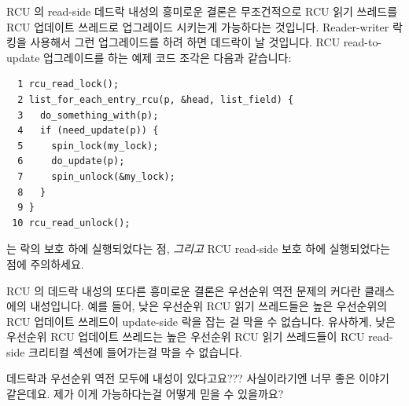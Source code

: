 RCU 의 read-side 데드락 내성의 흥미로운 결론은 무조건적으로 RCU 읽기 쓰레드를
RCU 업데이트 쓰레드로 업그레이드 시키는게 가능하다는 것입니다.
Reader-writer 락킹을 사용해서 그런 업그레이드를 하려 하면 데드락이 날 것입니다.
RCU read-to-update 업그레이드를 하는 예제 코드 조각은 다음과 같습니다:

\vspace{5pt}
\begin{minipage}[t]{\columnwidth}
\scriptsize
\begin{verbatim}
  1 rcu_read_lock();
  2 list_for_each_entry_rcu(p, &head, list_field) {
  3   do_something_with(p);
  4   if (need_update(p)) {
  5     spin_lock(my_lock);
  6     do_update(p);
  7     spin_unlock(&my_lock);
  8   }
  9 }
 10 rcu_read_unlock();
\end{verbatim}
\end{minipage}
\vspace{5pt}

 는 락의 보호 하에 실행되었다는 점, \emph{그리고} RCU read-side
보호 하에 실행되었다는 점에 주의하세요.

RCU 의 데드락 내성의 또다른 흥미로운 결론은 우선순위 역전 문제의 커다란
클래스에의 내성입니다.
예를 들어, 낮은 우선순위 RCU 읽기 쓰레드들은 높은 우선순위의 RCU 업데이트
쓰레드이 update-side 락을 잡는 걸 막을 수 없습니다.
유사하게, 낮은 우선순위 RCU 업데이트 쓰레드는 높은 우선순위 RCU 읽기 쓰레드들이
RCU read-side 크리티컬 섹션에 들어가는걸 막을 수 없습니다.

\QuickQuiz{}
	데드락과 우선순위 역전 모두에 내성이 있다고요???
	사실이라기엔 너무 좋은 이야기 같은데요.
	제가 이게 가능하다는걸 어떻게 믿을 수 있을까요?
	\iffalse

